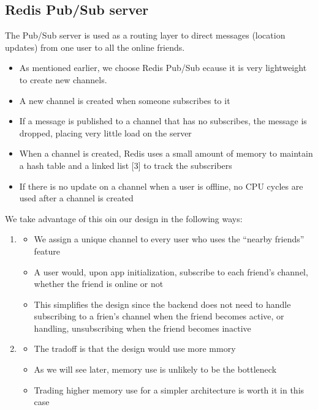\documentclass{report}
\theoremstyle{definition}
\let\oldsubsection\subsection
\renewcommand{\subsection}{\oldsubsection*}
\begin{document}
\subsection{Redis Pub/Sub server}

The Pub/Sub server is used as a routing layer to direct messages (location updates) from one user to all the online friends.

\begin{itemize}
\item
As mentioned earlier, we choose Redis Pub/Sub ecause it is very lightweight to create new channels.
\item
A new channel is created when someone subscribes to it
\item
If a message is published to a channel that has no subscribes, the message is dropped, placing very little load on the server
\item
When a channel is created, Redis uses a small amount of memory to maintain a hash table and a linked list [3] to track the subscribers
\item
If there is no update on a channel when a user is offline, no CPU cycles are used after a channel is created
\end{itemize}

We take advantage of this oin our design in the following ways:

\begin{enumerate}
\item

\begin{itemize}
\item
We assign a unique channel to every user who uses the ``nearby friends'' feature
\item
A user would, upon app initialization, subscribe to each friend's channel, whether the friend is online or not
\item
This simplifies the design since the backend does not need to handle subscribing to a frien's channel when the friend becomes active, or handling, unsubscribing when the friend becomes inactive
\end{itemize}

\item

\begin{itemize}
\item
The tradoff is that the design would use more mmory
\item
As we will see later, memory use is unlikely to be the bottleneck
\item
Trading higher memory use for a simpler architecture is worth it in this case
\end{itemize}
\end{enumerate}
\end{document}
